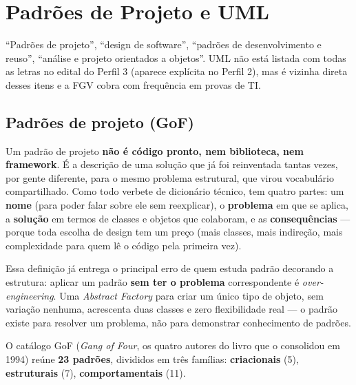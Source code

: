 \chapter{Padrões de Projeto e UML}
\label{cap:padroes-uml-teoria}

\begin{edital}
“Padrões de projeto”, “design de software”, “padrões de desenvolvimento e
reuso”, “análise e projeto orientados a objetos”. UML não está listada com
todas as letras no edital do Perfil 3 (aparece explícita no Perfil 2), mas é
vizinha direta desses itens e a FGV cobra com frequência em provas de TI.
\end{edital}

\section{Padrões de projeto (GoF)}

\begin{conceito}
Um padrão de projeto \textbf{não é código pronto, nem biblioteca, nem
framework}. É a descrição de uma solução que já foi reinventada tantas
vezes, por gente diferente, para o mesmo problema estrutural, que virou
vocabulário compartilhado. Como todo verbete de dicionário técnico, tem
quatro partes: um \textbf{nome} (para poder falar sobre ele sem reexplicar),
o \textbf{problema} em que se aplica, a \textbf{solução} em termos de
classes e objetos que colaboram, e as \textbf{consequências} --- porque toda
escolha de design tem um preço (mais classes, mais indireção, mais
complexidade para quem lê o código pela primeira vez).

Essa definição já entrega o principal erro de quem estuda padrão decorando
a estrutura: aplicar um padrão \textbf{sem ter o problema} correspondente é
\textit{over-engineering}. Uma \textit{Abstract Factory} para criar um
único tipo de objeto, sem variação nenhuma, acrescenta duas classes e zero
flexibilidade real --- o padrão existe para resolver um problema, não para
demonstrar conhecimento de padrões.

O catálogo GoF (\textit{Gang of Four}, os quatro autores do livro que o
consolidou em 1994) reúne \textbf{23 padrões}, divididos em três famílias:
\textbf{criacionais} (5), \textbf{estruturais} (7), \textbf{comportamentais}
(11).
\end{conceito}

